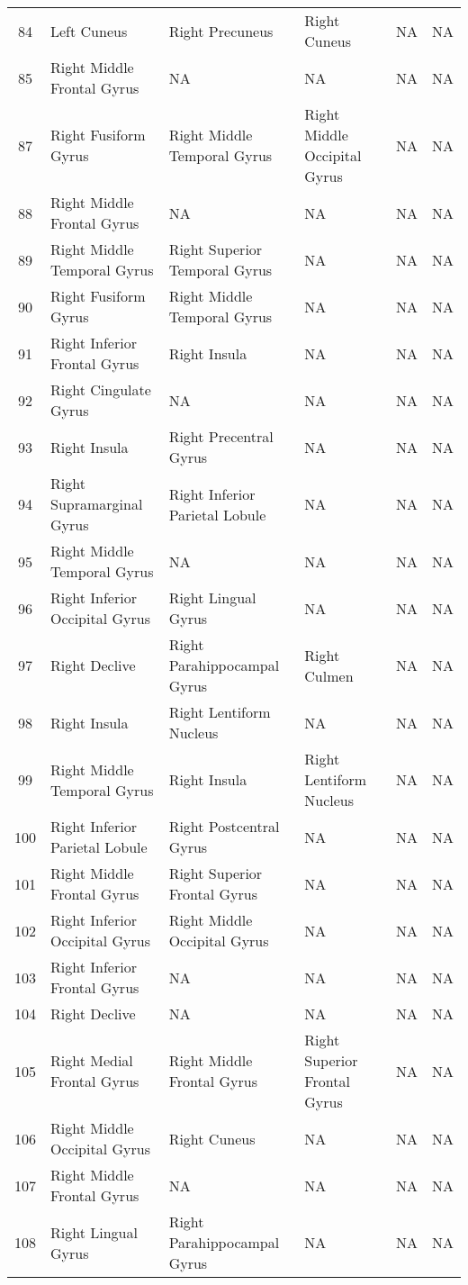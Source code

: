 \documentclass[10pt,letterpaper]{article}\usepackage[]{graphicx}\usepackage[]{color}
\begin{document}
\begin{center}
\begin{longtable}[c]{cp{1.1in}p{1.1in}p{1.1in}p{1.1in}p{1.1in}}
		84 & Left Cuneus & Right Precuneus & Right Cuneus & NA & NA \\
		85 & Right Middle Frontal Gyrus	& NA & NA & NA & NA \\
		87 & Right Fusiform Gyrus & Right Middle Temporal Gyrus	& Right Middle Occipital Gyrus & NA	& NA \\
		88 & Right Middle Frontal Gyrus	& NA & NA & NA & NA \\
		89 & Right Middle Temporal Gyrus & Right Superior Temporal Gyrus & NA & NA & NA \\
		90 & Right Fusiform Gyrus & Right Middle Temporal Gyrus	& NA & NA & NA \\
		91 & Right Inferior Frontal Gyrus & Right Insula & NA & NA & NA \\
		92 & Right Cingulate Gyrus & NA	& NA & NA & NA \\
		93 & Right Insula & Right Precentral Gyrus & NA	& NA & NA \\
		94 & Right Supramarginal Gyrus & Right Inferior Parietal Lobule	& NA & NA & NA \\
		95 & Right Middle Temporal Gyrus & NA & NA & NA & NA \\
		96 & Right Inferior Occipital Gyrus & Right Lingual Gyrus & NA & NA	& NA \\
		97 & Right Declive & Right Parahippocampal Gyrus & Right Culmen	& NA & NA \\
		98 & Right Insula & Right Lentiform Nucleus	& NA & NA & NA \\
		99 & Right Middle Temporal Gyrus & Right Insula	& Right Lentiform Nucleus & NA & NA \\
		100	& Right Inferior Parietal Lobule & Right Postcentral Gyrus & NA	& NA & NA \\
		101	& Right Middle Frontal Gyrus & Right Superior Frontal Gyrus	& NA & NA & NA \\
		102	& Right Inferior Occipital Gyrus & Right Middle Occipital Gyrus	& NA & NA & NA \\
		103	& Right Inferior Frontal Gyrus & NA	& NA & NA & NA \\
		104	& Right Declive & NA & NA & NA & NA \\
		105	& Right Medial Frontal Gyrus & Right Middle Frontal Gyrus & Right Superior Frontal Gyrus & NA & NA \\
		106	& Right Middle Occipital Gyrus & Right Cuneus & NA & NA	& NA \\
		107	& Right Middle Frontal Gyrus & NA & NA & NA	& NA \\
		108	& Right Lingual Gyrus & Right Parahippocampal Gyrus	& NA & NA & NA \\

\end{longtable}
\end{center}
\end{document}

